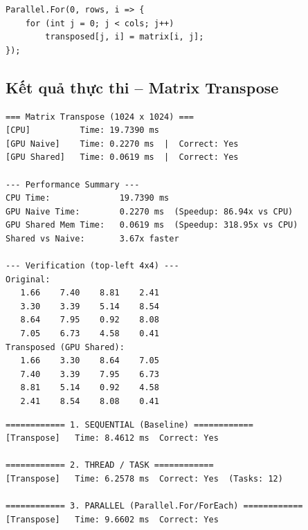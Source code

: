 \documentclass[12pt,a4paper]{article}
\begin{document}
\begin{lstlisting}[style=csharpstyle, caption={C\# Parallel.For -- Matrix Transpose}, label={lst:trans_par}]
Parallel.For(0, rows, i => {
    for (int j = 0; j < cols; j++)
        transposed[j, i] = matrix[i, j];
});
\end{lstlisting}

\subsection{Kết quả thực thi -- Matrix Transpose}

\begin{outputbox}
\begin{verbatim}
=== Matrix Transpose (1024 x 1024) ===
[CPU]          Time: 19.7390 ms
[GPU Naive]    Time: 0.2270 ms  |  Correct: Yes
[GPU Shared]   Time: 0.0619 ms  |  Correct: Yes

--- Performance Summary ---
CPU Time:              19.7390 ms
GPU Naive Time:        0.2270 ms  (Speedup: 86.94x vs CPU)
GPU Shared Mem Time:   0.0619 ms  (Speedup: 318.95x vs CPU)
Shared vs Naive:       3.67x faster

--- Verification (top-left 4x4) ---
Original:
   1.66    7.40    8.81    2.41
   3.30    3.39    5.14    8.54
   8.64    7.95    0.92    8.08
   7.05    6.73    4.58    0.41
Transposed (GPU Shared):
   1.66    3.30    8.64    7.05
   7.40    3.39    7.95    6.73
   8.81    5.14    0.92    4.58
   2.41    8.54    8.08    0.41
\end{verbatim}
\end{outputbox}

\begin{outputbox}
\begin{verbatim}
============ 1. SEQUENTIAL (Baseline) ============
[Transpose]   Time: 8.4612 ms  Correct: Yes

============ 2. THREAD / TASK ============
[Transpose]   Time: 6.2578 ms  Correct: Yes  (Tasks: 12)

============ 3. PARALLEL (Parallel.For/ForEach) ============
[Transpose]   Time: 9.6602 ms  Correct: Yes
\end{verbatim}
\end{outputbox}
\end{document}

